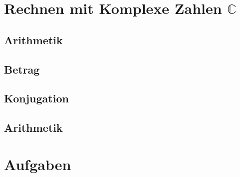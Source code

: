 \documentclass{article}
\begin{document}
    \large  

    \section{Rechnen mit Komplexe Zahlen $\mathbb{C}$}

    \subsection{Arithmetik}

    \subsection{Betrag}

    

    \subsection{Konjugation}

    

    \subsection{Arithmetik}

    

    \section{Aufgaben}

    
\end{document}
